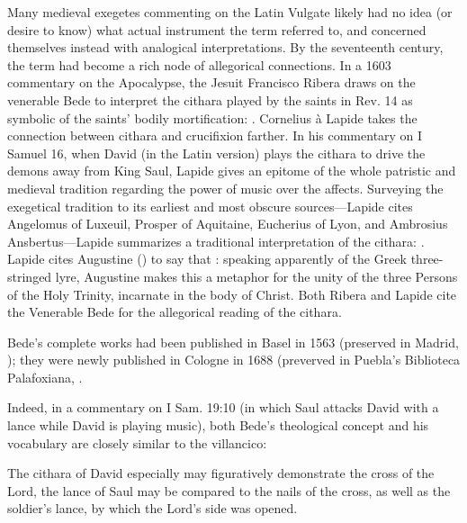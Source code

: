 Many medieval exegetes commenting on the Latin Vulgate likely had no idea (or
desire to know) what actual instrument the term  referred to, and
concerned themselves instead with analogical interpretations.
By the seventeenth century, the term had become a rich node of allegorical
connections.
In a 1603 commentary on the Apocalypse, the Jesuit Francisco Ribera draws on
the venerable Bede to interpret the cithara played by the saints in Rev. 14 as
symbolic of the saints' bodily mortification: .%
    \Autocite[429]{Ribera:Apocalypse}
Cornelius à Lapide takes the connection between cithara and crucifixion
farther.  
In his commentary on I Samuel 16, when David (in the Latin version) plays the
cithara to drive the demons away from King Saul, Lapide gives an epitome of the
whole patristic and medieval tradition regarding the power of music over the
affects.
Surveying the exegetical tradition to its earliest and most obscure
sources---Lapide cites Angelomus of Luxeuil, Prosper of Aquitaine, Eucherius of
Lyon, and Ambrosius Ansbertus---Lapide summarizes a traditional interpretation
of the cithara: .%
    \Autocite[370]{Lapide:1Samuel}
Lapide cites Augustine () to say that : speaking apparently of the Greek
three-stringed lyre, Augustine makes this a metaphor for the unity of the three
Persons of the Holy Trinity, incarnate in the body of Christ.%
    \Autocite[370]{Lapide:1Samuel}
Both Ribera and Lapide cite the Venerable Bede for the allegorical reading of
the cithara.%
\begin{Footnote}
    Bede's complete works had been published in Basel in 1563 (preserved in
    Madrid, ); they were newly published in Cologne in 1688
    (preverved in Puebla's Biblioteca Palafoxiana, .
\end{Footnote}
Indeed, in a commentary on I Sam. 19:10 (in which Saul attacks David with a
lance while David is playing music), both Bede's theological concept and his
vocabulary are closely similar to the villancico: 
\begin{quoting} 
    The cithara  of David especially may figuratively
    demonstrate the cross of the Lord, the lance  of Saul may
    be compared to the nails  of the cross, as well as the
    soldier's lance, by which the Lord's side was opened.%
        \Autocite[123]{Bede:Commentaries2}
\end{quoting}

